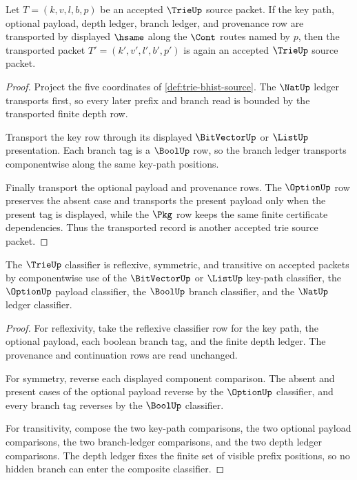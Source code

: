 \begin{theorem}\label{thm:trie-carrier-stability}
Let $T=(k,v,l,b,p)$ be an accepted $\TrieUp$ source packet. If the key path,
optional payload, depth ledger, branch ledger, and provenance row are
transported by displayed $\hsame$ along the $\Cont$ routes named by $p$, then
the transported packet $T'=(k',v',l',b',p')$ is again an accepted $\TrieUp$
source packet.
\end{theorem}
\begin{proof}
Project the five coordinates of \autoref{def:trie-bhist-source}. The
$\NatUp$ ledger transports first, so every later prefix and branch read is
bounded by the transported finite depth row.

Transport the key row through its displayed $\BitVectorUp$ or $\ListUp$
presentation. Each branch tag is a $\BoolUp$ row, so the branch ledger
transports componentwise along the same key-path positions.

Finally transport the optional payload and provenance rows. The $\OptionUp$
row preserves the absent case and transports the present payload only when the
present tag is displayed, while the $\Pkg$ row keeps the same finite
certificate dependencies. Thus the transported record is another accepted
trie source packet.
\end{proof}

\begin{theorem}\label{thm:trie-classifier-laws}
The $\TrieUp$ classifier is reflexive, symmetric, and transitive on accepted
packets by componentwise use of the $\BitVectorUp$ or $\ListUp$ key-path
classifier, the $\OptionUp$ payload classifier, the $\BoolUp$ branch
classifier, and the $\NatUp$ ledger classifier.
\end{theorem}
\begin{proof}
For reflexivity, take the reflexive classifier row for the key path, the
optional payload, each boolean branch tag, and the finite depth ledger. The
provenance and continuation rows are read unchanged.

For symmetry, reverse each displayed component comparison. The absent and
present cases of the optional payload reverse by the $\OptionUp$ classifier,
and every branch tag reverses by the $\BoolUp$ classifier.

For transitivity, compose the two key-path comparisons, the two optional
payload comparisons, the two branch-ledger comparisons, and the two depth
ledger comparisons. The depth ledger fixes the finite set of visible prefix
positions, so no hidden branch can enter the composite classifier.
\end{proof}

